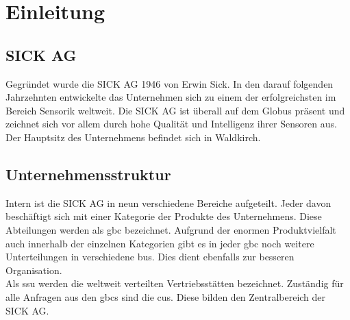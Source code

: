 \chapter{Einleitung}

\section{SICK AG} 
Gegründet wurde die SICK AG 1946 von Erwin Sick. In den darauf folgenden Jahrzehnten entwickelte das Unternehmen sich zu einem der erfolgreichsten im Bereich Sensorik weltweit. Die SICK AG ist überall auf dem Globus präsent und zeichnet sich vor allem durch hohe Qualität und Intelligenz ihrer Sensoren aus. Der Hauptsitz des Unternehmens befindet sich in Waldkirch. 
\section{Unternehmensstruktur}
Intern ist die SICK AG in neun verschiedene Bereiche aufgeteilt. Jeder davon beschäftigt sich mit einer Kategorie der Produkte des Unternehmens. Diese Abteilungen werden als \acrfull{gbc} bezeichnet. Aufgrund der enormen Produktvielfalt auch innerhalb der einzelnen Kategorien gibt es in jeder \acrshort{gbc} noch weitere Unterteilungen in verschiedene \acrshort{bu}s. Dies dient ebenfalls zur besseren Organisation. \\
Als \acrfull{ssu} werden die weltweit verteilten Vertriebsstätten bezeichnet. Zuständig für alle Anfragen aus den \acrshort{gbc}s sind die \acrfull{cu}s. Diese bilden den Zentralbereich der SICK AG.
